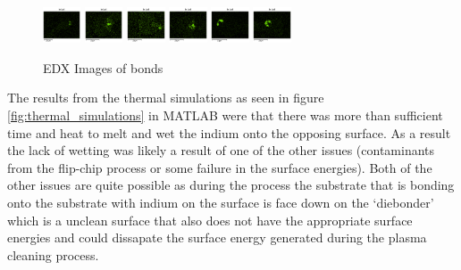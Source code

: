 \begin{figure}
    \includegraphics[width=0.1\textwidth]{Main/Ch2/extracted/Indium/In-EP-EDx_TLED-02-A1-s1_media_image7.png}
    \includegraphics[width=0.1\textwidth]{Main/Ch2/extracted/Indium/In-EP-EDx_TLED-02-A1-s2_media_image7.png}
    \includegraphics[width=0.1\textwidth]{Main/Ch2/extracted/Indium/In-EP-EDx_TLED-02-A2-s1_media_image7.png}
    \includegraphics[width=0.1\textwidth]{Main/Ch2/extracted/Indium/In-EP-EDx_TLED-02-A2-s2_media_image7.png}
    \includegraphics[width=0.1\textwidth]{Main/Ch2/extracted/Indium/In-EP-EDx_TLED-02-B2-s1_media_image7.png}
    \includegraphics[width=0.1\textwidth]{Main/Ch2/extracted/Indium/In-EP-EDx_TLED-02-B2-s2_media_image7.png}
    \caption{EDX Images of bonds}
    \label{fig:EDX_indium_2}
\end{figure}


The results from the thermal simulations as seen in figure \ref{fig:thermal_simulations} in MATLAB were that there was more than sufficient time and heat to melt and wet the indium onto the opposing surface. As a result the lack of wetting was likely a result of one of the other issues (contaminants from the flip-chip process or some failure in the surface energies).
Both of the other issues are quite possible as during the process the substrate that is bonding onto the substrate with indium on the surface is face down on the `diebonder' which is a unclean surface that also does not have the appropriate surface energies and could dissapate the surface energy generated during the plasma cleaning process.


